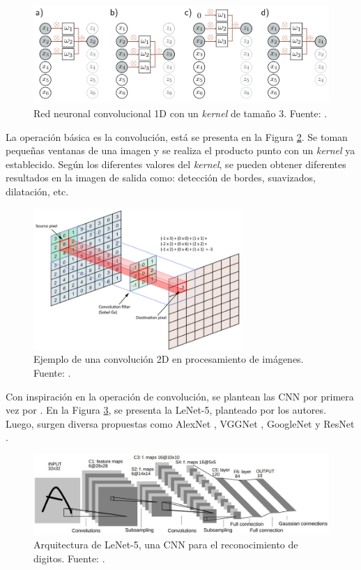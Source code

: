 \begin{figure}[H]
	\centering
	\includegraphics[width=\textwidth]{../img/theory/cnn}
	\caption{Red neuronal convolucional 1D con un \textit{kernel} de tamaño 3. Fuente: \cite{prince2023understanding}.}
	\label{fig:cnn_1d}
\end{figure}


La operación básica es la convolución, está se presenta en la Figura \ref{fig:cnn}. Se toman pequeñas ventanas de una imagen y se realiza el producto punto con un \textit{kernel} ya establecido. Según los diferentes valores del \textit{kernel}, se pueden obtener diferentes resultados en la imagen de salida como: detección de bordes, suavizados, dilatación, etc.


\begin{figure}[H]
	\centering
	\includegraphics[width=0.7\textwidth]{../img/neoantigen/cnn}
	\caption{Ejemplo de una convolución 2D en procesamiento de imágenes. Fuente: \cite{Shuchen2022}.}
	\label{fig:cnn}
\end{figure}

Con inspiración en la operación de convolución, se plantean las CNN por primera vez por \cite{lecun1998gradient}. En la Figura \ref{fig:cnn3}, se presenta la LeNet-5, planteado por los autores. Luego, surgen diversa propuestas como AlexNet \citep{krizhevsky2012imagenet}, VGGNet \citep{simonyan2014very}, GoogleNet \citep{szegedy2015going} y ResNet \citep{he2016deep}.

\begin{figure}[H]
	\centering
	\includegraphics[width=\textwidth]{../img/neoantigen/cnn3}
	\caption{Arquitectura de LeNet-5, una CNN para el reconocimiento de digitos. Fuente: \cite{lecun1998gradient}.}
	\label{fig:cnn3}
\end{figure}



